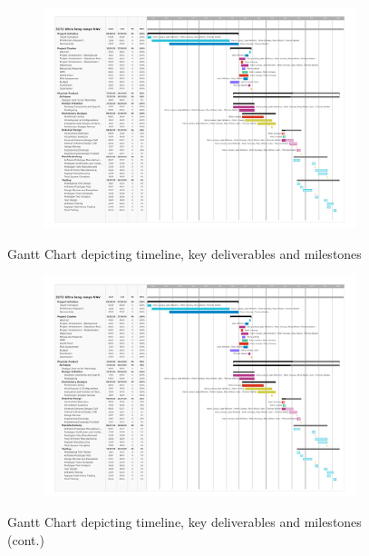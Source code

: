 \begin{appendices}
\begin{landscape}
\begin{figure}[!b]
    \centering
    \begin{subfigure}{1.4\textwidth}
        \includegraphics[page = 1, width=1\textwidth]{3172_Ultra_long_range_UAV-4.pdf}
        \label{fig:gantt1}
    \end{subfigure}
    \vspace{-1cm}
    \caption[Gantt Chart]{Gantt Chart depicting timeline, key deliverables and milestones}
    \label{fig:Gantt}
\end{figure}%
\begin{figure}[ht]\ContinuedFloat
    \centering
    \begin{subfigure}{1.4\textwidth}
        \includegraphics[page = 2,width=1\textwidth]{3172_Ultra_long_range_UAV-4.pdf}
        \label{fig:gantt2}
    \end{subfigure}
    \vspace{-1cm}
    \caption[]{Gantt Chart depicting timeline, key deliverables and milestones (cont.)}
\end{figure}




\end{landscape}
\end{appendices}
